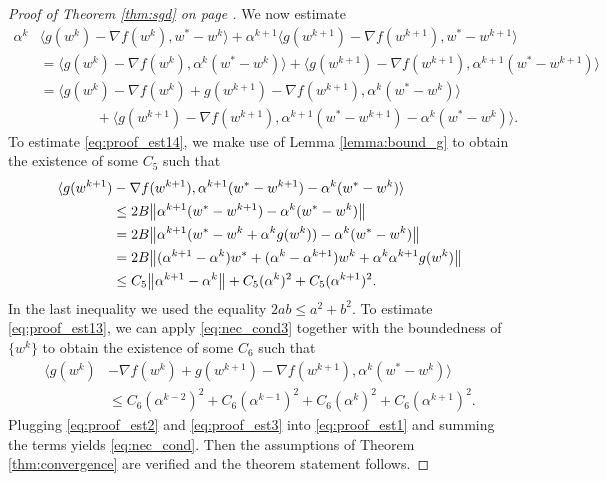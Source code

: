 \begin{proof}[Proof of Theorem \ref{thm:sgd} on page \pageref{thm:sgd}]
  We now estimate
  \begin{subequations}\label{eq:proof_est1}
    \begin{align}
      \label{eq:proof_est11} \alpha^k
      & \langle g(w^{k})-\nabla f(w^{k}),w^*-w^{k}\rangle + \alpha^{k+1}\langle g(w^{k+1})-\nabla f(w^{k+1}),w^*-w^{k+1}\rangle \\
      \label{eq:proof_est12}
      & = \langle g(w^{k})-\nabla f(w^{k}),\alpha^k(w^*-w^{k})\rangle + \langle g(w^{k+1})-\nabla f(w^{k+1}),\alpha^{k+1}(w^*-w^{k+1})\rangle \\
      \label{eq:proof_est13}
      & = \langle g(w^{k})-\nabla f(w^{k}) + g(w^{k+1})-\nabla f(w^{k+1}),\alpha^k(w^*-w^{k})\rangle \\
      \label{eq:proof_est14}
      & \qquad \qquad + \langle g(w^{k+1})-\nabla f(w^{k+1}),\alpha^{k+1}(w^*-w^{k+1})-\alpha^k(w^*-w^{k})\rangle.
    \end{align}
  \end{subequations}
  To estimate \eqref{eq:proof_est14}, we make use of Lemma \ref{lemma:bound_g} to obtain the existence of some $C_5$ such that
  \begin{equation}\label{eq:proof_est2}
    \begin{aligned}
    \langle g(w^{k+1})
    & -\nabla f(w^{k+1}),\alpha^{k+1}(w^*-w^{k+1})-\alpha^k(w^*-w^{k})\rangle \\
    & \le 2B\norm{\alpha^{k+1}(w^*-w^{k+1})-\alpha^k(w^*-w^{k})} \\
    & = 2B\norm{\alpha^{k+1}(w^*-w^k+\alpha^kg(w^k))-\alpha^k(w^*-w^{k})} \\
    & = 2B\norm{(\alpha^{k+1}-\alpha^k)w^* + (\alpha^k-\alpha^{k+1})w^k +\alpha^k\alpha^{k+1} g(w^k)} \\
    & \le C_5 \nrm{\alpha^{k+1}-\alpha^k} + C_5(\alpha^k)^2 + C_5(\alpha^{k+1})^2.
    \end{aligned}
  \end{equation}
  In the last inequality we used the equality $2ab\le a^2+b^2$. To estimate \eqref{eq:proof_est13}, we can apply \eqref{eq:nec_cond3} together with the boundedness of $\{w^k\}$ to obtain the existence of some $C_6$ such that
  \begin{equation}\label{eq:proof_est3}
    \begin{aligned}
      \langle g(w^{k})&-\nabla f(w^{k}) + g(w^{k+1})-\nabla f(w^{k+1}),\alpha^k(w^*-w^{k})\rangle \\
      & \le C_6(\alpha^{k-2})^2 + C_6(\alpha^{k-1})^2 + C_6(\alpha^{k})^2 + C_6(\alpha^{k+1})^2.
    \end{aligned}
  \end{equation}
  Plugging \eqref{eq:proof_est2} and \eqref{eq:proof_est3} into \eqref{eq:proof_est1} and summing the terms yields \eqref{eq:nec_cond}. Then the assumptions of Theorem \ref{thm:convergence} are verified and the theorem statement follows.
\end{proof}

